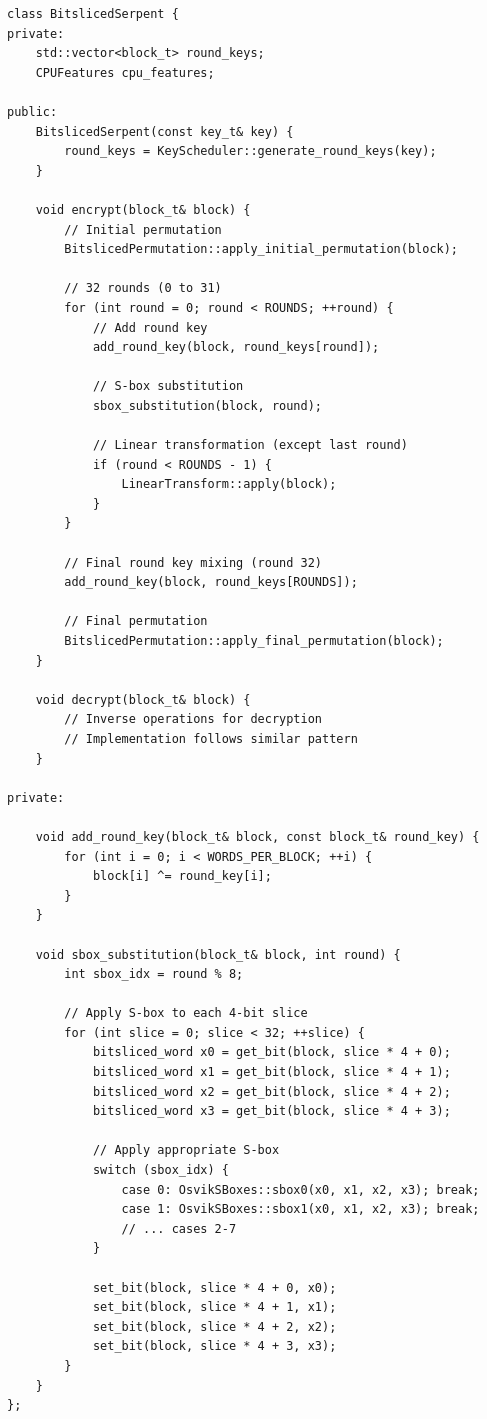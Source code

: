 \documentclass[12pt,a4paper]{article}
\begin{document}
\begin{lstlisting}[caption=Complete Bitsliced Serpent Cipher]
class BitslicedSerpent {
private:
    std::vector<block_t> round_keys;
    CPUFeatures cpu_features;

public:
    BitslicedSerpent(const key_t& key) {
        round_keys = KeyScheduler::generate_round_keys(key);
    }

    void encrypt(block_t& block) {
        // Initial permutation
        BitslicedPermutation::apply_initial_permutation(block);
        
        // 32 rounds (0 to 31)
        for (int round = 0; round < ROUNDS; ++round) {
            // Add round key
            add_round_key(block, round_keys[round]);
            
            // S-box substitution
            sbox_substitution(block, round);
            
            // Linear transformation (except last round)
            if (round < ROUNDS - 1) {
                LinearTransform::apply(block);
            }
        }
        
        // Final round key mixing (round 32)
        add_round_key(block, round_keys[ROUNDS]);
        
        // Final permutation
        BitslicedPermutation::apply_final_permutation(block);
    }

    void decrypt(block_t& block) {
        // Inverse operations for decryption
        // Implementation follows similar pattern
    }

private:

    void add_round_key(block_t& block, const block_t& round_key) {
        for (int i = 0; i < WORDS_PER_BLOCK; ++i) {
            block[i] ^= round_key[i];
        }
    }

    void sbox_substitution(block_t& block, int round) {
        int sbox_idx = round % 8;
        
        // Apply S-box to each 4-bit slice
        for (int slice = 0; slice < 32; ++slice) {
            bitsliced_word x0 = get_bit(block, slice * 4 + 0);
            bitsliced_word x1 = get_bit(block, slice * 4 + 1);
            bitsliced_word x2 = get_bit(block, slice * 4 + 2);
            bitsliced_word x3 = get_bit(block, slice * 4 + 3);
            
            // Apply appropriate S-box
            switch (sbox_idx) {
                case 0: OsvikSBoxes::sbox0(x0, x1, x2, x3); break;
                case 1: OsvikSBoxes::sbox1(x0, x1, x2, x3); break;
                // ... cases 2-7
            }
            
            set_bit(block, slice * 4 + 0, x0);
            set_bit(block, slice * 4 + 1, x1);
            set_bit(block, slice * 4 + 2, x2);
            set_bit(block, slice * 4 + 3, x3);
        }
    }
};
\end{lstlisting}
\end{document}

